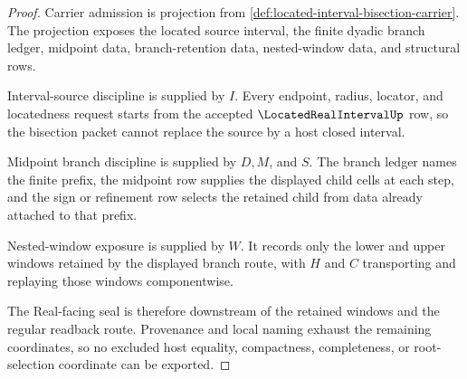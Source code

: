 \begin{proof}
Carrier admission is projection from \autoref{def:located-interval-bisection-carrier}. The projection exposes the located source interval, the finite dyadic branch ledger, midpoint data, branch-retention data, nested-window data, and structural rows.

Interval-source discipline is supplied by $I$. Every endpoint, radius, locator, and locatedness request starts from the accepted $\LocatedRealIntervalUp$ row, so the bisection packet cannot replace the source by a host closed interval.

Midpoint branch discipline is supplied by $D,M$, and $S$. The branch ledger names the finite prefix, the midpoint row supplies the displayed child cells at each step, and the sign or refinement row selects the retained child from data already attached to that prefix.

Nested-window exposure is supplied by $W$. It records only the lower and upper windows retained by the displayed branch route, with $H$ and $C$ transporting and replaying those windows componentwise.

The Real-facing seal is therefore downstream of the retained windows and the regular readback route. Provenance and local naming exhaust the remaining coordinates, so no excluded host equality, compactness, completeness, or root-selection coordinate can be exported.
\end{proof}

